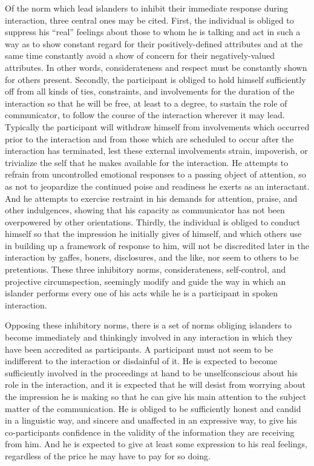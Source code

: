 \documentclass[openany,nobib]{tufte-book}
\begin{document}
Of the norm which lead islanders to inhibit their immediate response
during interaction, three central ones may be cited. First, the
individual is obliged to suppress his ``real'' feelings about those to
whom he is talking and act in such a way as to show constant regard for
their positively-defined attributes and at the same time constantly
avoid a show of concern for their negatively-valued attributes. In other
words, considerateness and respect must be constantly shown for others
present. Secondly, the participant is obliged to hold himself
sufficiently off from all kinds of ties, constraints, and involvements
for the duration of the interaction so that he will be free, at least to
a degree, to sustain the role of communicator, to follow the course of
the interaction wherever it may lead. Typically the participant will
withdraw himself from involvements which occurred prior to the
interaction and from those which are scheduled to occur after the
interaction has terminated, lest these external involvements strain,
impoverish, or trivialize the self that he makes available for the
interaction. He attempts to refrain from uncontrolled emotional
responses to a passing object of attention, so as not to jeopardize the
continued poise and readiness he exerts as an interactant. And he
attempts to exercise restraint in his demands for attention, praise, and
other indulgences, showing that his capacity as communicator has not
been overpowered by other orientations. Thirdly, the individual is
obliged to conduct himself so that the impression he initially gives of
himself, and which others use in building up a framework of response to
him, will not be discredited later in the interaction by gaffes, boners,
disclosures, and the like, nor seem to others to be pretentious. These
three inhibitory norms, considerateness, self-control, and projective
circumspection, seemingly modify and guide the way in which an islander
performs every one of his acts while he is a participant in spoken
interaction.

Opposing these inhibitory norms, there is a set of norms obliging
islanders to become immediately and thinkingly involved in any
interaction in which they have been accredited as participants. A
participant must not seem to be indifferent to the interaction or
disdainful of it. He is expected to become sufficiently involved in the
proceedings at hand to be unselfconscious about his role in the
interaction, and it is expected that he will desist from worrying about
the impression he is making so that he can give his main attention to
the subject matter of the communication. He is obliged to be
sufficiently honest and candid in a linguistic way, and sincere and
unaffected in an expressive way, to give his co-participants confidence
in the validity of the information they are receiving from him. And he
is expected to give at least some expression to his real feelings,
regardless of the price he may have to pay for so doing.
\end{document}
